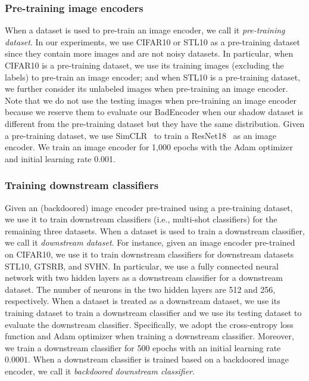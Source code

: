 \subsubsection{Pre-training image encoders}\label{pre_training_image_encoder} When a dataset is used to pre-train an image encoder, we call it \emph{pre-training dataset}. In our experiments, we use CIFAR10 or STL10 as a pre-training dataset since they contain more images and are not noisy datasets. In particular, when CIFAR10  is a pre-training dataset, we use its training images (excluding the labels) to pre-train an image encoder; and  when STL10 is a pre-training dataset, we further consider its unlabeled images when pre-training an image encoder. Note that we do not use the testing images  when pre-training an image encoder because we reserve them to evaluate our BadEncoder when our shadow dataset is different from the pre-training dataset but they have the same distribution. Given a pre-training dataset, we use SimCLR~\cite{chen2020simple} to train a ResNet18~\cite{he2016deep} as an image encoder.   We train an image encoder for 1,000 epochs with the Adam optimizer and initial learning rate 0.001. 

\subsubsection{Training downstream classifiers} Given an (backdoored) image encoder pre-trained using a pre-training dataset, we use it to train downstream classifiers (i.e., multi-shot classifiers) for the remaining three datasets. When a dataset is used to train a downstream classifier, we call it \emph{downstream dataset}. For instance, given an image encoder pre-trained on CIFAR10, we use it to train downstream classifiers for downstream datasets STL10, GTSRB, and SVHN. In particular, we use a fully connected neural network with two hidden layers as a downstream classifier for a downstream dataset. The number of neurons in the two hidden layers are 512 and 256, respectively. When a dataset is treated as a downstream dataset, we use its training dataset to train a downstream classifier and we use its testing dataset to evaluate the downstream classifier. 
Specifically, we adopt the cross-entropy loss function and Adam optimizer when training a downstream classifier. Moreover, we train a downstream classifier for 500 epochs with an initial learning rate $0.0001$. When a downstream classifier is trained based on a backdoored image encoder, we call it \emph{backdoored downstream classifier}. 






